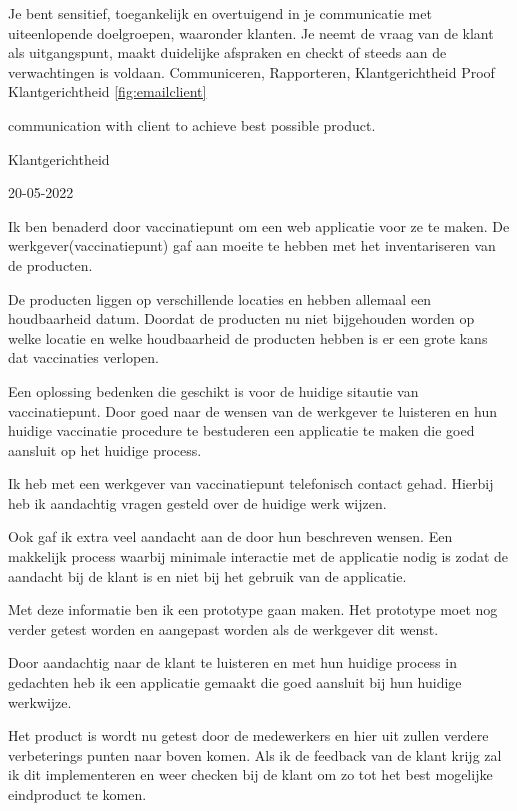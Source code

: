\competentie
{%
	\competentieformulier
	{%
		Je bent sensitief, toegankelijk en overtuigend in je
		communicatie met uiteenlopende doelgroepen,
		waaronder klanten. Je neemt de vraag van de klant als
		uitgangspunt, maakt duidelijke afspraken en checkt of
		steeds aan de verwachtingen is voldaan.
	}
	{%
		Communiceren,
		Rapporteren,%
		Klantgerichtheid%
	}
	{%
		Proof
	}
	{%
		Klantgerichtheid
	}
	{%
		\ref{fig:emailclient}
	}
}
{%
	\bewijs
	{%
		communication with client to achieve best possible product.
	}
	{%
		\starr
		{%

			Klantgerichtheid
		}
		{%
			20-05-2022
		}
		{%
			Ik ben benaderd door vaccinatiepunt om een web applicatie voor ze te maken.
			De werkgever(vaccinatiepunt) gaf aan moeite te hebben met het inventariseren van de producten.

			De producten liggen op verschillende locaties en hebben allemaal een houdbaarheid datum.
			Doordat de producten nu niet bijgehouden worden op welke locatie en welke houdbaarheid de producten hebben is er een grote kans dat vaccinaties verlopen.



		}
		{%
			Een oplossing bedenken die geschikt is voor de huidige sitautie van vaccinatiepunt.
			Door goed naar de wensen van de werkgever te luisteren en hun huidige vaccinatie procedure te bestuderen een applicatie te maken die goed aansluit op het huidige process.

		}
		{%
			Ik heb met een werkgever van vaccinatiepunt telefonisch contact gehad.
			Hierbij heb ik aandachtig vragen gesteld over de huidige werk wijzen.

			Ook gaf ik extra veel aandacht aan de door hun beschreven wensen.
			Een makkelijk process waarbij minimale interactie met de applicatie nodig is zodat de aandacht bij de klant is en niet bij het gebruik van de applicatie.

			Met deze informatie ben ik een prototype gaan maken.
			Het prototype moet nog verder getest worden en aangepast worden als de werkgever dit wenst.
		}
		{%
			Door aandachtig naar de klant te luisteren en met hun huidige process in gedachten heb ik een applicatie gemaakt die goed aansluit bij hun huidige werkwijze.

			Het product is wordt nu getest door de medewerkers en hier uit zullen verdere verbeterings punten naar boven komen.
			Als ik de feedback van de klant krijg zal ik dit implementeren en weer checken bij de klant om zo tot het best mogelijke eindproduct te komen.

}}}
